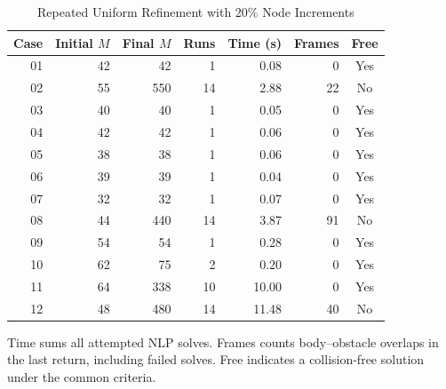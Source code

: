 \begin{table}[t]
\caption{Repeated Uniform Refinement with 20\% Node Increments}\label{tab:refinement}
\centering\footnotesize
\begin{tabular}{@{}rrrrrrc@{}}\toprule
Case&Initial $M$&Final $M$&Runs&Time (s)&Frames&Free\\\midrule
01&42&42&1&0.08&0&Yes\\
02&55&550&14&2.88&22&No\\
03&40&40&1&0.05&0&Yes\\
04&42&42&1&0.06&0&Yes\\
05&38&38&1&0.06&0&Yes\\
06&39&39&1&0.04&0&Yes\\
07&32&32&1&0.07&0&Yes\\
08&44&440&14&3.87&91&No\\
09&54&54&1&0.28&0&Yes\\
10&62&75&2&0.20&0&Yes\\
11&64&338&10&10.00&0&Yes\\
12&48&480&14&11.48&40&No\\
\bottomrule\end{tabular}
\par\par\smallskip\parbox{\columnwidth}{\footnotesize Time sums all attempted NLP solves. Frames counts body--obstacle overlaps in the last return, including failed solves. Free indicates a collision-free solution under the common criteria.}
\end{table}